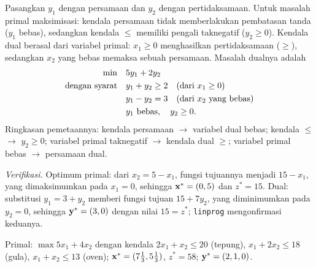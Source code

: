 Pasangkan $y_1$ dengan persamaan dan $y_2$ dengan pertidaksamaan. Untuk masalah primal maksimisasi: kendala persamaan tidak memberlakukan pembatasan tanda ($y_1$ bebas), sedangkan kendala $\leq$ memiliki pengali taknegatif ($y_2 \ge 0$). Kendala dual berasal dari variabel primal: $x_1 \ge 0$ menghasilkan pertidaksamaan ($\ge$), sedangkan $x_2$ yang bebas memaksa sebuah persamaan. Masalah dualnya adalah
\[
\begin{aligned}
\min \quad & 5y_1 + 2y_2 \\
\mbox{dengan syarat}\quad & y_1 + y_2 \ge 2 \quad \mbox{(dari } x_1 \ge 0\mbox{)} \\
& y_1 - y_2 = 3 \quad \mbox{(dari } x_2 \mbox{ yang bebas)} \\
& y_1 \mbox{ bebas}, \quad y_2 \ge 0 .
\end{aligned}
\]
Ringkasan pemetaannya: kendala persamaan $\to$ variabel dual bebas; kendala $\leq$ $\to$ $y_2 \ge 0$; variabel primal taknegatif $\to$ kendala dual $\geq$; variabel primal bebas $\to$ persamaan dual.

\emph{Verifikasi.} Optimum primal: dari $x_2 = 5 - x_1$, fungsi tujuannya menjadi $15 - x_1$, yang dimaksimumkan pada $x_1 = 0$, sehingga $\mathbf{x}^* = (0, 5)$ dan $z^* = 15$. Dual: substitusi $y_1 = 3 + y_2$ memberi fungsi tujuan $15 + 7y_2$, yang diminimumkan pada $y_2 = 0$, sehingga $\mathbf{y}^* = (3, 0)$ dengan nilai $15 = z^*$; \texttt{linprog} mengonfirmasi keduanya.


Primal: $\max 5x_1 + 4x_2$ dengan kendala $2x_1 + x_2 \le 20$ (tepung), $x_1 + 2x_2 \le 18$ (gula), $x_1 + x_2 \le 13$ (oven); $\mathbf{x}^* = (7\tfrac13, 5\tfrac13)$, $z^* = 58$; $\mathbf{y}^* = (2, 1, 0)$.

